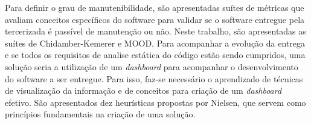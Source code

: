 Para definir o grau de manutenibilidade, são apresentadas suítes de métricas que avaliam conceitos específicos do software para validar se o software entregue pela tercerizada é passível de manutenção ou não. Neste trabalho, são apresentadas as suítes de Chidamber-Kemerer e MOOD. Para acompanhar a evolução da entrega e se todos os requisitos de analise estática do código estão sendo cumpridos, uma solução seria a utilização de um \textit{dashboard} para acompanhar o desenvolvimento do software a ser entregue. Para isso, faz-se necessário o aprendizado de técnicas de visualização da informação e de conceitos para criação de um \textit{dashboard} efetivo. São apresentados dez heurísticas propostas por Nielsen, que servem como princípios fundamentais na criação de uma solução.